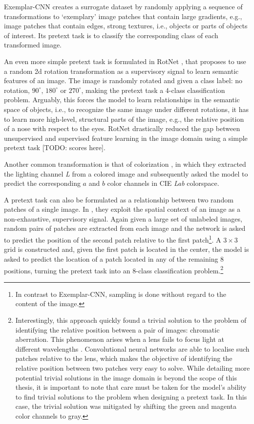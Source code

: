 Exemplar-CNN \cite{dosovitskiy_discriminative_2014} creates a surrogate dataset by randomly applying a sequence of transformations to `exemplary' image patches that contain large gradients, e.g., image patches that contain edges, strong textures, i.e., objects or parts of objects of interest.
Its pretext task is to classify the corresponding class of each transformed image.

An even more simple pretext task is formulated in RotNet \cite{gidaris2018unsupervised}, that proposes to use a random 2d rotation transformation as a supervisory signal to learn semantic features of an image.
The image is randomly rotated and given a class label: no rotation, $90^\circ$, $180^\circ$ or $270^\circ$, making the pretext task a 4-class classification problem.
Arguably, this forces the model to learn relationships in the semantic space of objects, i.e., to recognize the same image under different rotations, it has to learn more high-level, structural parts of the image, e.g., the relative position of a nose with respect to the eyes.
RotNet drastically reduced the gap between unsupervised and supervised feature learning in the image domain using a simple pretext task [TODO: scores here].

Another common transformation is that of colorization \cite{zhang_colorful_2016}, in which they extracted the lighting channel \textit{L} from a colored image and subsequently asked the model to predict the corresponding $a$ and $b$ color channels in CIE \textit{Lab} colorspace.

A pretext task can also be formulated as a relationship between two random patches of a single image. In \cite{doersch2015unsupervised}, they exploit the spatial context of an image as a non-exhaustive, supervisory signal.
Again given a large set of unlabeled images, random pairs of patches are extracted from each image and the network is asked to predict the position of the second patch relative to the first patch\footnote{In contrast to Exemplar-CNN, sampling is done without regard to the content of the image.}.
A $3\times 3$ grid is constructed and, given the first patch is located in the center, the model is asked to predict the location of a patch located in any of the remaining 8 positions, turning the pretext task into an 8-class classification problem.\footnote{
Interestingly, this approach quickly found a trivial solution to the problem of identifying the relative position between a pair of images: chromatic aberration.
This phenomenon arises when a lens fails to focus light at different wavelengths \cite{brewster_treatise_1835}.
Convolutional neural networks are able to localise such patches relative to the lens, which makes the objective of identifying the relative position between two patches very easy to solve.
While detailing more potential trivial solutions in the image domain is beyond the scope of this thesis, it is important to note that care must be taken for the model's ability to find trivial solutions to the problem when designing a pretext task.
In this case, the trivial solution was mitigated by shifting the green and magenta color channels to gray.
}

